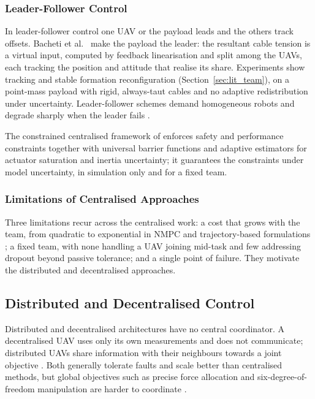 \subsubsection{Leader-Follower Control}

In leader-follower control one UAV or the payload leads and the others track offsets. Bacheti et al.\ \cite{tensionbased} make the payload the leader: the resultant cable tension is a virtual input, computed by feedback linearisation and split among the UAVs, each tracking the position and attitude that realise its share. Experiments show tracking and stable formation reconfiguration (Section~\ref{sec:lit_team}), on a point-mass payload with rigid, always-taut cables and no adaptive redistribution under uncertainty. Leader-follower schemes demand homogeneous robots and degrade sharply when the leader fails \cite{quan2025swarm}.

The constrained centralised framework of \cite{9945662} enforces safety and performance constraints together with universal barrier functions and adaptive estimators for actuator saturation and inertia uncertainty; it guarantees the constraints under model uncertainty, in simulation only and for a fixed team.

\subsubsection{Limitations of Centralised Approaches}

Three limitations recur across the centralised work: a cost that grows with the team, from quadratic \cite{efficient} to exponential in NMPC and trajectory-based formulations \cite{tudelft}; a fixed team, with none handling a UAV joining mid-task and few addressing dropout beyond passive tolerance; and a single point of failure. They motivate the distributed and decentralised approaches.

\subsection{Distributed and Decentralised Control}

Distributed and decentralised architectures have no central coordinator. A decentralised UAV uses only its own measurements and does not communicate; distributed UAVs share information with their neighbours towards a joint objective \cite{nathanReviewAutonomousMultiagent2011}. Both generally tolerate faults and scale better than centralised methods, but global objectives such as precise force allocation and six-degree-of-freedom manipulation are harder to coordinate \cite{scattoliniArchitecturesDistributedHierarchical2009}.

